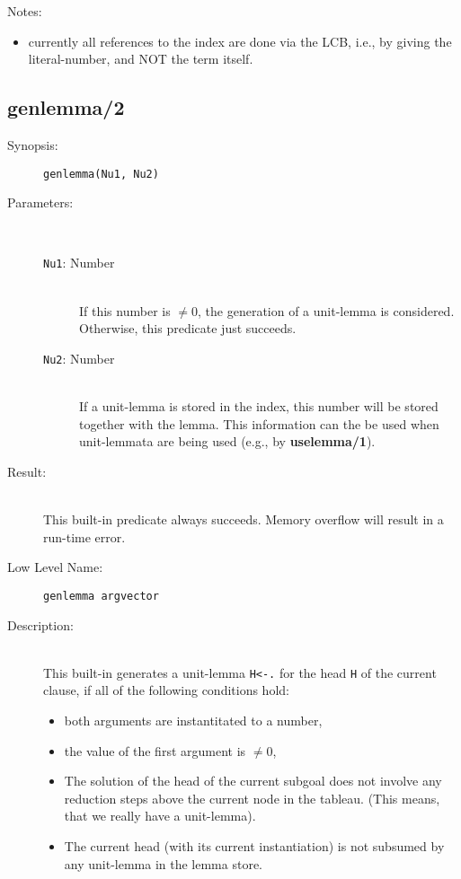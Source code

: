 Notes:
\begin{itemize}
\item
currently all references to the index are done via the LCB,
i.e., by giving the literal-number, and NOT the term itself.
\end{itemize}

\subsection{genlemma/2}

\begin{description}
\item[Synopsis:]
	{\tt genlemma(Nu1, Nu2)}
\item[Parameters:]\ \\
	\begin{description}
	\item[{\tt Nu1}: Number]\ \\
	If this number is $\neq 0$, the generation of a unit-lemma
	is considered. Otherwise, this predicate just succeeds.
	\item[{\tt Nu2}: Number]\ \\
	If a unit-lemma is stored in the index, this number will be
	stored together with the lemma. This information can the
	be used when unit-lemmata are being used (e.g., by {\bf uselemma/1}).
	\end{description}
\item[Result:]\ \\
	This built-in predicate always succeeds. Memory overflow
	will result in a run-time error.
\item[Low Level Name:]
	{\tt genlemma argvector}

\item[Description:]\ \\
This built-in generates a unit-lemma {\tt H<-.} for the
head {\tt H} of the current clause, if all of the following
conditions hold:
\begin{itemize}
\item
both arguments are instantitated to a number,
\item
the value of the first argument is $\neq 0$,
\item
The solution of the head of the current subgoal does not involve
any reduction steps above the current node in the tableau.
(This means, that we really have a unit-lemma).
\item
The current head (with its current instantiation) is not subsumed
by any unit-lemma in the lemma store.
\end{itemize}


\end{description}
